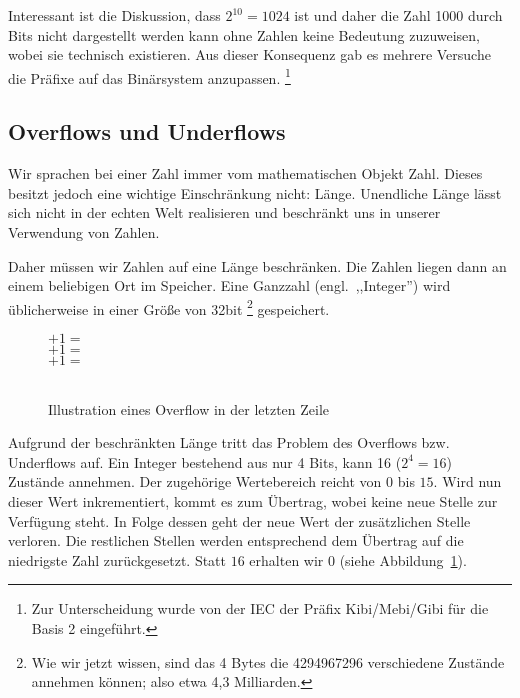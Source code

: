 Interessant ist die Diskussion, dass $2^{10} = 1024$ ist und
daher die Zahl 1000 durch Bits nicht dargestellt werden kann ohne
Zahlen keine Bedeutung zuzuweisen, wobei sie technisch existieren.
Aus dieser Konsequenz gab es mehrere Versuche die Präfixe
auf das Binärsystem anzupassen.%
\footnote{Zur Unterscheidung wurde von der IEC der Präfix Kibi/Mebi/Gibi
für die Basis 2 eingeführt.}

\subsection{Overflows und Underflows}
%
Wir sprachen bei einer Zahl immer vom mathematischen Objekt Zahl. Dieses
besitzt jedoch eine wichtige Einschränkung nicht: Länge. Unendliche Länge
lässt sich nicht in der echten Welt realisieren und beschränkt uns in
unserer Verwendung von Zahlen.

Daher müssen wir Zahlen auf eine Länge beschränken. Die Zahlen liegen
dann an einem beliebigen Ort im Speicher. Eine Ganzzahl (engl.~,,Integer'')
wird üblicherweise in einer Größe von 32bit%
\footnote{Wie wir jetzt wissen, sind das 4 Bytes die 4294967296
verschiedene Zustände annehmen können; also etwa 4,3 Milliarden.}
gespeichert.

\begin{figure}[ht]
  \begin{center}
        $+ 1 =$ \\
        $+ 1 =$ \\
        $+ 1 =$ \\
        \hspace{27.5pt}~
  \end{center}
  \caption{Illustration eines Overflow in der letzten Zeile}
  \label{fig:overflow}
\end{figure}
%
Aufgrund der beschränkten Länge tritt das Problem des Overflows bzw.
Underflows auf. Ein Integer bestehend aus nur 4 Bits, kann 16 ($2^4 = 16$)
Zustände annehmen. Der zugehörige Wertebereich reicht von $0$ bis $15$.
Wird nun dieser Wert inkrementiert, kommt es zum Übertrag, wobei keine
neue Stelle zur Verfügung steht. In Folge dessen geht der neue Wert der
zusätzlichen Stelle verloren. Die restlichen Stellen werden entsprechend
dem Übertrag auf die niedrigste Zahl zurückgesetzt. Statt $16$ erhalten wir
$0$ (siehe Abbildung~\ref{fig:overflow}).

